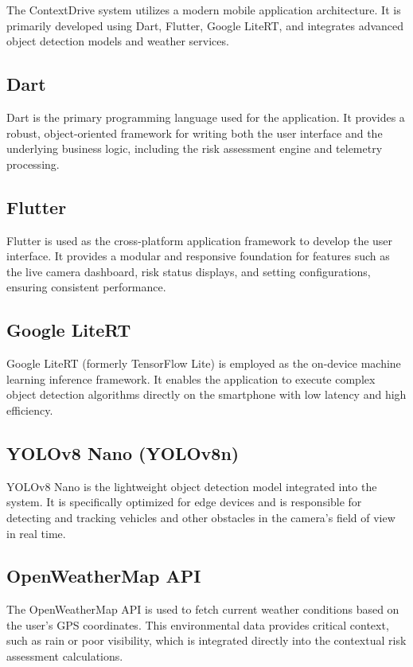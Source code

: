 The ContextDrive system utilizes a modern mobile application architecture. It is primarily developed using Dart, Flutter, Google LiteRT, and integrates advanced object detection models and weather services.

\subsection{Dart}
Dart is the primary programming language used for the application. It provides a robust, object-oriented framework for writing both the user interface and the underlying business logic, including the risk assessment engine and telemetry processing.

\subsection{Flutter}
Flutter is used as the cross-platform application framework to develop the user interface. It provides a modular and responsive foundation for features such as the live camera dashboard, risk status displays, and setting configurations, ensuring consistent performance.

\subsection{Google LiteRT}
Google LiteRT (formerly TensorFlow Lite) is employed as the on-device machine learning inference framework. It enables the application to execute complex object detection algorithms directly on the smartphone with low latency and high efficiency.

\subsection{YOLOv8 Nano (YOLOv8n)}
YOLOv8 Nano is the lightweight object detection model integrated into the system. It is specifically optimized for edge devices and is responsible for detecting and tracking vehicles and other obstacles in the camera's field of view in real time.

\subsection{OpenWeatherMap API}
The OpenWeatherMap API is used to fetch current weather conditions based on the user's GPS coordinates. This environmental data provides critical context, such as rain or poor visibility, which is integrated directly into the contextual risk assessment calculations.
